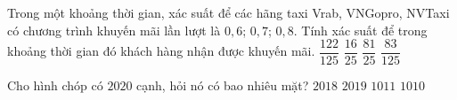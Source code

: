 \begin{ex}%
	Trong một khoảng thời gian, xác suất để các hãng taxi Vrab, VNGopro, NVTaxi có chương trình khuyến mãi lần lượt là $0{,}6$; $0{,}7$; $0{,}8$. Tính xác suất để trong khoảng thời gian đó khách hàng nhận được khuyến mãi.
	\choice
	{\True $\dfrac{122}{125}$}
	{$\dfrac{16}{25}$}
	{$\dfrac{81}{25}$}
	{$\dfrac{83}{125}$}
\end{ex}

\begin{ex}%
	Cho hình chóp có $2020$ cạnh, hỏi nó có bao nhiêu mặt?
	\choice
	{$2018$}
	{$2019$}
	{\True $1011$}
	{$1010$}
\end{ex}

